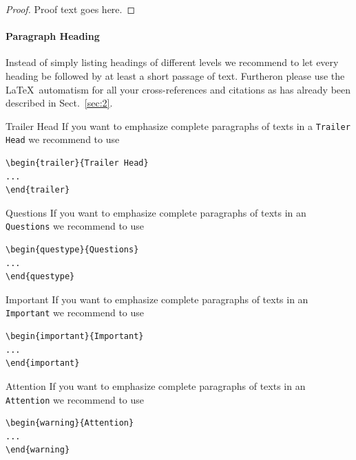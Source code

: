 \begin{proof}
	Proof text goes here.
\end{proof}

\paragraph{Paragraph Heading} %
Instead of simply listing headings of different levels we recommend to let every heading be followed by at least a short passage of text. Furtheron please use the \LaTeX\ automatism for all your cross-references and citations as has already been described in Sect.~\ref{sec:2}.

\begin{trailer}{Trailer Head}
	If you want to emphasize complete paragraphs of texts in a \verb|Trailer Head| we recommend to
	use  \begin{verbatim}\begin{trailer}{Trailer Head}
...
\end{trailer}\end{verbatim}
\end{trailer}
%
\begin{questype}{Questions}
	If you want to emphasize complete paragraphs of texts in an \verb|Questions| we recommend to
	use  \begin{verbatim}\begin{questype}{Questions}
...
\end{questype}\end{verbatim}
\end{questype}
%
%
\begin{important}{Important}
	If you want to emphasize complete paragraphs of texts in an \verb|Important| we recommend to
	use  \begin{verbatim}\begin{important}{Important}
...
\end{important}\end{verbatim}
\end{important}
%
\clearpage
\begin{warning}{Attention}
	If you want to emphasize complete paragraphs of texts in an \verb|Attention| we recommend to
	use  \begin{verbatim}\begin{warning}{Attention}
...
\end{warning}\end{verbatim}
\end{warning}

